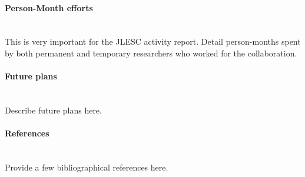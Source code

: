 \begin{refsection}[mybeautifulproject]
\paragraph{Person-Month efforts}~\\

This is very important for the JLESC activity report. 
Detail person-months spent by both permanent and temporary researchers 
who worked for the collaboration.

\paragraph{Future plans}~\\

Describe future plans here.

\paragraph{References}~\\

Provide a few bibliographical references here.

\printbibliography[heading=none,notkeyword=own]

\end{refsection}